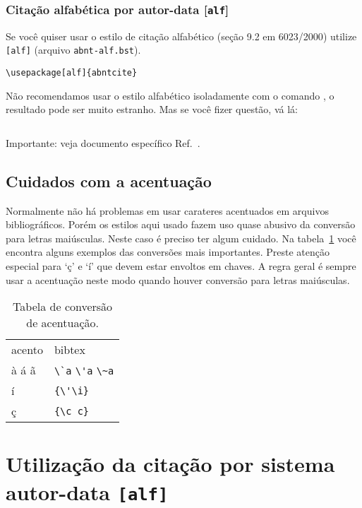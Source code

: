\documentclass[espacosimples]{abnt}
\begin{document}
\subsection{Citação alfabética por autor-data [{\tt alf}]}

Se você quiser usar o estilo de citação alfabético
(seção 9.2 em 6023/2000\cite{NBR6023:2000})
utilize {\tt [alf]} (arquivo {\tt abnt-alf.bst}).
\begin{verbatim}
\usepackage[alf]{abntcite}
\end{verbatim}
Não recomendamos usar o estilo alfabético isoladamente com o comando
\verb++, o resultado pode ser muito estranho. Mas se
você fizer questão, vá lá:
\begin{verbatim}

\end{verbatim}

Importante: veja documento específico Ref.~.

\section{Cuidados com a acentuação}

Normalmente não há problemas em usar carateres acentuados em arquivos
bibliográficos. Porém os estilos aqui usado fazem uso quase abusivo da
conversão para letras maiúsculas. Neste caso é preciso ter algum cuidado.
Na tabela~\ref{tabela-acentos} você encontra alguns exemplos das conversões
mais importantes. Preste atenção especial para `ç' e `í' que devem estar
envoltos em chaves.
A regra geral é sempre usar a acentuação neste modo quando
houver conversão para letras maiúsculas.

\begin{table}[htbp]
\begin{center}
\begin{tabular}{ll}\hline\hline
acento & bibtex\\
à á ã & \verb+\`a+ \verb+\'a+ \verb+\~a+\\
í & \verb+{\'\i}+\\
ç & \verb+{\c c}+\\
\hline\hline
\end{tabular}
\end{center}
\caption{Tabela de conversão de acentuação.}
\label{tabela-acentos}
\end{table}


\chapter{Utilização da citação por sistema autor-data {\tt [alf]}}
\end{document}
